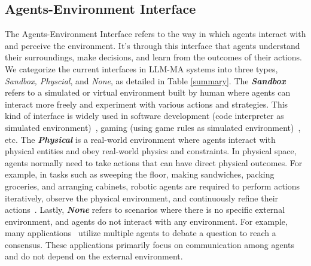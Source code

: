 \subsection{Agents-Environment Interface}
The Agents-Environment Interface refers to the  way in which agents interact with and perceive the environment. It's through this interface that agents understand their surroundings, make decisions, and learn from the outcomes of their actions.
We categorize the current interfaces in LLM-MA systems into three types, \emph{Sandbox, Physcial}, and \emph{None}, as detailed in Table \ref{summary}.
The \emph{\textbf{Sandbox}} refers to a simulated or virtual environment built by human where agents can interact more freely and experiment with various actions and strategies. This kind of interface is widely used in software development (code interpreter as simulated environment)~\cite{hong2023metagpt}, gaming (using game rules as simulated environment)~\cite{mao2023alympics}, etc.  The \emph{\textbf{Physical}} is a real-world environment where agents interact with physical entities and obey real-world physics and constraints. In physical space, agents normally need to take actions that can have direct physical outcomes. For example, in tasks such as sweeping the floor, making sandwiches, packing groceries, and arranging cabinets, robotic agents are required to perform actions iteratively, observe the physical environment, and continuously refine their actions~\cite{mandi2023roco}. Lastly, \emph{\textbf{None}} refers to scenarios where there is no specific external environment, and agents do not interact with any environment. For example, many applications~\cite{du2023improving,xiong2023examining,chan2023chateval} utilize multiple agents to debate a question to reach a consensus. These applications primarily focus on communication among agents and do not depend on the external environment.

